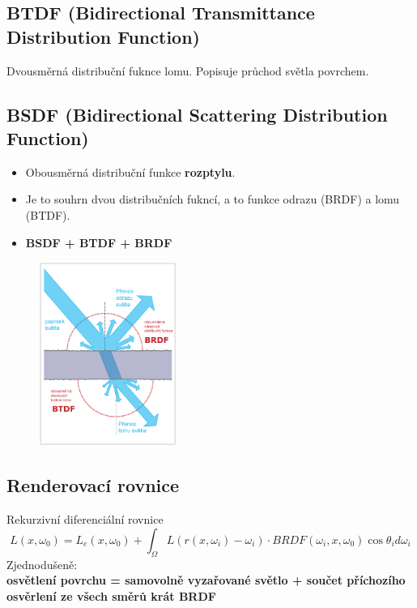 \subsection{BTDF (Bidirectional Transmittance Distribution Function)}
Dvousměrná distribuční fuknce lomu. Popisuje průchod světla povrchem.

\subsection{BSDF (Bidirectional Scattering Distribution Function)}
\begin{itemize}
	\item Obousměrná distribuční funkce \textbf{rozptylu}.
	\item Je to souhrn dvou distribučních fukncí, a to funkce odrazu (BRDF) a lomu (BTDF).
	\item \textbf{BSDF + BTDF + BRDF}
\end{itemize}
\begin{figure}[H]
\centering
\includegraphics[width=0.4\textwidth]{assets/6_bsdf}
\end{figure}


\subsection{Renderovací rovnice}
Rekurzivní diferenciální rovnice
\begin{equation*}
	L(x, \omega_0) = L_e(x,\omega_0) + \int_{\Omega} L(r(x,\omega_i) - \omega_i) \cdot BRDF(\omega_i,x,\omega_0) \cos{\theta_id\omega_i}
\end{equation*}
Zjednodušeně: \\
\textbf{osvětlení povrchu = samovolně vyzařované světlo + součet příchozího osvěrlení ze všech směrů krát BRDF}